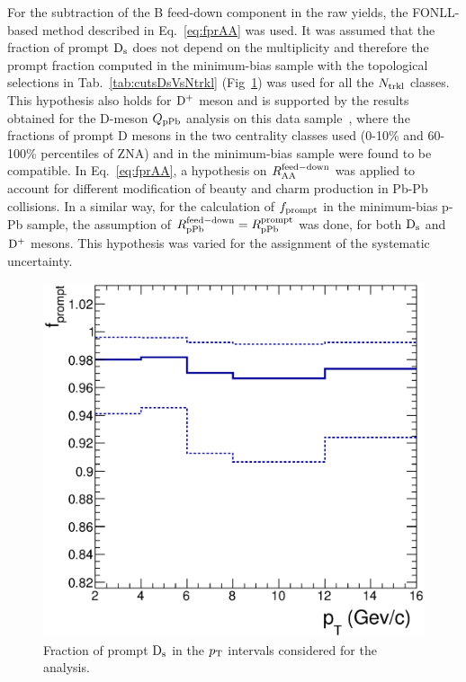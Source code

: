 For the subtraction of the B feed-down component in the raw yields, the FONLL-based method 
described in Eq.~\ref{eq:fprAA} was used. It was 
assumed that the fraction of prompt ${\rm D_s}$ does not depend on the 
multiplicity and therefore the prompt fraction computed in 
the minimum-bias sample with the topological selections in Tab.~\ref{tab:cutsDsVsNtrkl} 
(Fig~\ref{fig:DsfPrompt}) was used for all the $N_{\rm trkl}$ classes. 
This hypothesis also holds for ${\rm D^+}$ meson and is supported 
by the results obtained for the D-meson $Q_{\rm pPb}$ analysis on this data sample~\cite{ALICEPAS2017008}, 
where the fractions of prompt D mesons in the two centrality classes used (0-10\% and 60-100\%
percentiles of ZNA) and in the minimum-bias sample were found to be compatible. 
In Eq.~\ref{eq:fprAA}, a hypothesis on $R_{\rm AA}^{\rm feed-down}$
was applied to account for different modification of beauty and charm 
production in Pb-Pb collisions. In a similar way, for the calculation of $f_{\rm prompt}$ in 
the minimum-bias p-Pb sample, the assumption of $R_{\rm pPb}^{\rm feed-down} = R_{\rm pPb}^{\rm prompt}$ 
was done, for both ${\rm D_s}$ and ${\rm D^+}$ mesons.
This hypothesis was varied for the assignment of the systematic uncertainty. 

\begin{figure}[!h]
\centering
 \includegraphics[width=.6\textwidth]{FigCap6/DsFPrompt.eps}
  \caption{Fraction of prompt ${\rm D_s}$ in the $p_{\rm T}$ intervals considered for the analysis.}
 \label{fig:DsfPrompt}
\end{figure}

